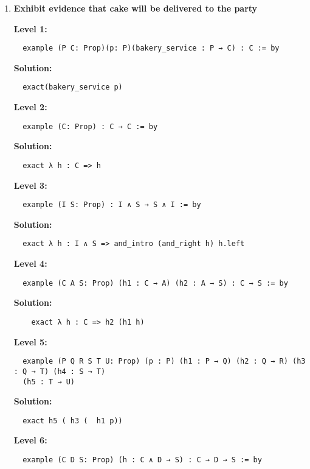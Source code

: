 \documentclass{article}
\theoremstyle{theorem}
\theoremstyle{definition}
\theoremstyle{remark}
\begin{document}
\begin{enumerate}
  \item \textbf{Exhibit evidence that cake will be delivered to the party}

  \textbf{Level 1:}
  \begin{verbatim}
  example (P C: Prop)(p: P)(bakery_service : P → C) : C := by
  \end{verbatim}

  \textbf{Solution:}
  \begin{verbatim}
  exact(bakery_service p)
  \end{verbatim}

  \textbf{Level 2:}
  \begin{verbatim}
  example (C: Prop) : C → C := by
  \end{verbatim}

  \textbf{Solution:}
  \begin{verbatim}
  exact λ h : C => h
  \end{verbatim}

  \textbf{Level 3:}
  \begin{verbatim}
  example (I S: Prop) : I ∧ S → S ∧ I := by
  \end{verbatim}

  \textbf{Solution:}
  \begin{verbatim}
  exact λ h : I ∧ S => and_intro (and_right h) h.left
  \end{verbatim}

  \textbf{Level 4:}
  \begin{verbatim}
  example (C A S: Prop) (h1 : C → A) (h2 : A → S) : C → S := by
  \end{verbatim}

  \textbf{Solution:}
  \begin{verbatim}
    exact λ h : C => h2 (h1 h)
  \end{verbatim}

  \textbf{Level 5:}
  \begin{verbatim}
  example (P Q R S T U: Prop) (p : P) (h1 : P → Q) (h2 : Q → R) (h3 : Q → T) (h4 : S → T) 
  (h5 : T → U)
  \end{verbatim}

  \textbf{Solution:}
  \begin{verbatim}
  exact h5 ( h3 (  h1 p))
  \end{verbatim}

  \textbf{Level 6:}
  \begin{verbatim}
  example (C D S: Prop) (h : C ∧ D → S) : C → D → S := by
  \end{verbatim}


\end{enumerate}
\end{document}
